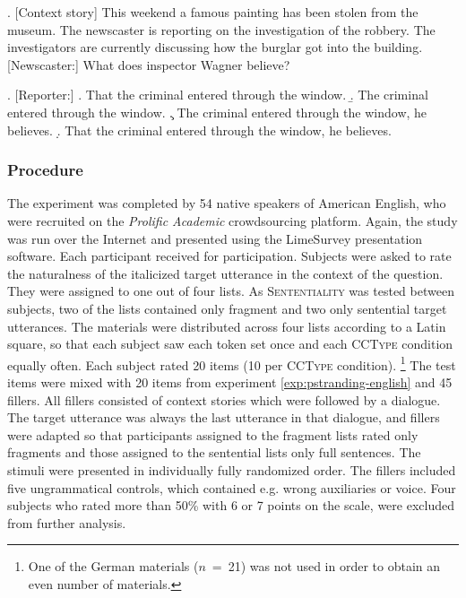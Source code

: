 \ex. [Context story] This weekend a famous painting has been stolen from the museum. The newscaster is reporting on the investigation of the robbery. The investigators are currently discussing how the burglar got into the building.\\\mbox{}[Newscaster:] What does inspector Wagner believe?


\ex. [Reporter:]
\a. That the criminal entered through the window.
\b. The criminal entered through the window.
\c. The criminal entered through the window, he believes.
\d. That the criminal entered through the window, he believes.

\subsubsection{Procedure}\label{sec:ccs-english-method}
The experiment was completed by 54 native speakers of American English, who were recruited on the \textit{Prolific Academic} crowdsourcing platform. Again, the study was run over the Internet and presented using the LimeSurvey presentation software. Each participant received  for participation. Subjects were asked to rate the naturalness of the italicized target utterance in the context of the question. They were assigned to one out of four lists. As \textsc{Sententiality} was tested between subjects, two of the lists contained only fragment and two only sentential target utterances. The materials were distributed across four lists according to a Latin square, so that each subject saw each token set once and each \textsc{CCType} condition equally often. 
Each subject rated 20 items (10 per \textsc{CCType} condition).%
%
\footnote{One of the German materials ($n$~=~21) was not used in order to obtain an even number of materials.}\afterfn%
%
The test items were mixed with 20 items from experiment \ref{exp:pstranding-english} and 45 fillers. All fillers consisted of context stories which were followed by a dialogue. The target utterance was always the last utterance in that dialogue, and fillers were adapted so that participants assigned to the fragment lists rated only fragments and those assigned to the sentential lists only full sentences. The stimuli were presented in individually fully randomized order. The fillers included five ungrammatical controls, which contained e.g. wrong auxiliaries or voice. Four subjects who rated more than 50\% with 6 or 7 points on the scale, were excluded from further analysis.

